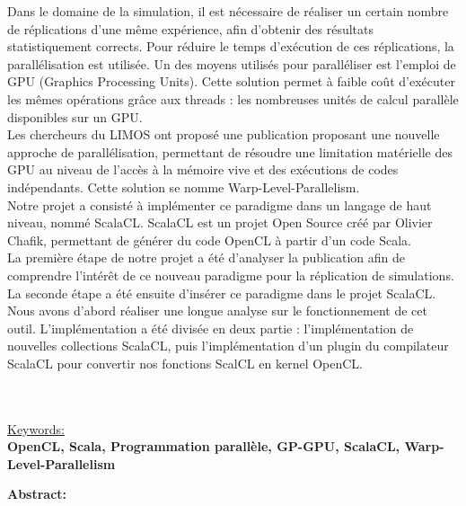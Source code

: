 \documentclass[a4paper,11pt]{report}
\begin{document}
\normalsize{
Dans le domaine de la simulation, il est nécessaire de réaliser un certain nombre de réplications d'une même expérience, afin d'obtenir des résultats statistiquement corrects. Pour réduire le temps d'exécution de ces réplications, la parallélisation est utilisée. Un des moyens utilisés pour paralléliser est l'emploi de GPU (Graphics Processing Units). Cette solution permet à faible coût d'exécuter les mêmes opérations grâce aux threads : les nombreuses unités de calcul parallèle disponibles sur un GPU.\\

Les chercheurs du LIMOS ont proposé une publication proposant une nouvelle approche de parallélisation, permettant de résoudre une limitation matérielle des GPU au niveau de l'accès à la mémoire vive et des exécutions de codes indépendants. Cette solution se nomme Warp-Level-Parallelism.\\

Notre projet a consisté à implémenter ce paradigme dans un langage de haut niveau, nommé ScalaCL. ScalaCL est un projet Open Source créé par Olivier Chafik, permettant de générer du code OpenCL à partir d'un code Scala.\\

La première étape de notre projet a été d'analyser la publication afin de comprendre l'intérêt de ce nouveau paradigme pour la réplication de simulations.\\

La seconde étape a été ensuite d'insérer ce paradigme dans le projet ScalaCL. Nous avons d'abord réaliser une longue analyse sur le fonctionnement de cet outil. L'implémentation a été divisée en deux partie : l'implémentation de nouvelles collections ScalaCL, puis l'implémentation d'un plugin du compilateur ScalaCL pour convertir nos fonctions ScalCL en kernel OpenCL.
}
\\ \\ \\
\begin{flushleft}
\large{ \underline {Keywords:}\bigskip}\\
{\bf OpenCL, Scala, Programmation parallèle, GP-GPU, ScalaCL,  Warp-Level-Parallelism}
\end{flushleft}

\newpage
\begin{flushleft}
\LARGE{ \bf {Abstract:}\bigskip}
\end{flushleft}
 
\end{document}
